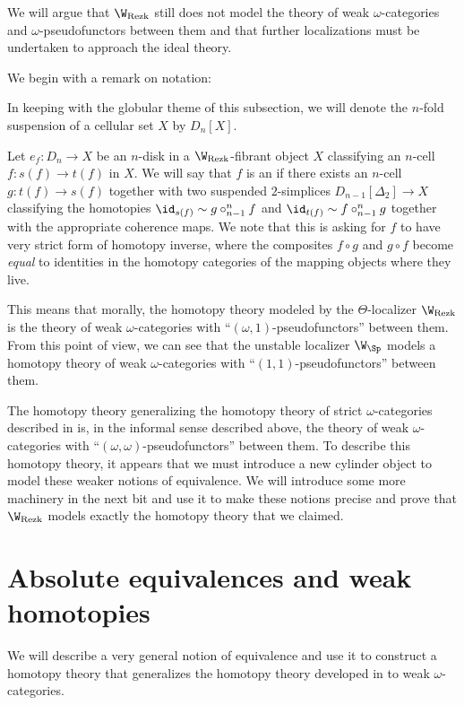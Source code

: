 We will argue that \(\W_{\operatorname{Rezk}}\) still does not model the theory of weak \(\omega\)-categories and \(\omega\)-pseudofunctors between them and that further localizations must be undertaken to approach the ideal theory.

We begin with a remark on notation:
\begin{rem} In keeping with the globular theme of this subsection, we will denote the \(n\)-fold suspension of a cellular set \(X\) by \(D_n[X]\).
\end{rem}

Let \(e_f:D_n\to X\) be an \(n\)-disk in a \(\W_{\operatorname{Rezk}}\)-fibrant object \(X\) classifying an \(n\)-cell \(f:s(f)\to t(f)\) in \(X\).  We will say that \(f\) is an  if there exists an \(n\)-cell \(g:t(f)\to s(f)\) together with two suspended \(2\)-simplices \(D_{n-1}[\Delta_2]\to X\) classifying the homotopies \(\id_{s(f)} \sim g\circ_{n-1}^n f\) and \(\id_{t(f)} \sim f\circ_{n-1}^n g\) together with the appropriate coherence maps.  We note that this is asking for \(f\) to have very strict form of homotopy inverse, where the composites \(f\circ g\) and \(g\circ f\) become \emph{equal} to identities in the homotopy categories of the mapping objects where they live. 

This means that morally, the homotopy theory modeled by the \(\Theta\)-localizer \(\W_{\operatorname{Rezk}}\) is the theory of weak \(\omega\)-categories with ``\((\omega,1)\)-pseudofunctors'' between them.  From this point of view, we can see that the unstable localizer \(\W_{\Sp}\) models a homotopy theory of weak \(\omega\)-categories with ``\((1,1)\)-pseudofunctors'' between them.  

The homotopy theory generalizing the homotopy theory of strict \(\omega\)-categories described in \cite{lmw} is, in the informal sense described above, the theory of weak \(\omega\)-categories with ``\((\omega,\omega)\)-pseudofunctors'' between them.  To describe this homotopy theory, it appears that we must introduce a new cylinder object to model these weaker notions of equivalence.
We will introduce some more machinery in the next bit and use it to make these notions precise and prove that \(\W_{\operatorname{Rezk}}\) models exactly the homotopy theory that we claimed.
\section{Absolute equivalences and weak homotopies} 
We will describe a very general notion of equivalence and use it to construct a homotopy theory that generalizes the homotopy theory developed in \cite{lmw} to weak \(\omega\)-categories.
